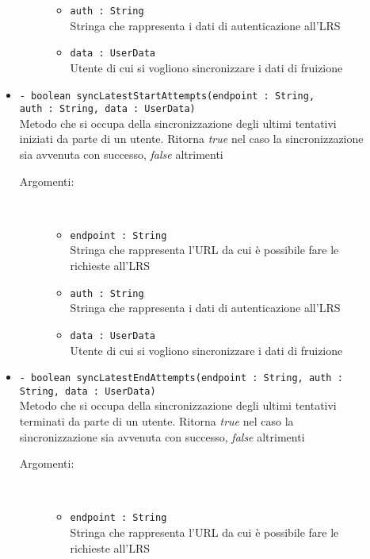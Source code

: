 \documentclass[../Tesi.tex]{subfiles}
\begin{document}
\begin{description}
\begin{itemize}
\begin{description}
\begin{itemize}
						\item \texttt{auth : String}\\
						Stringa che rappresenta i dati di autenticazione all'LRS

						\item \texttt{data : UserData}\\
						Utente di cui si vogliono sincronizzare i dati di fruizione
					\end{itemize}
				\end{description}

				\item \texttt{- boolean syncLatestStartAttempts(endpoint : String, \\auth : String, data : UserData)}\\
				Metodo che si occupa della sincronizzazione degli ultimi tentativi iniziati da parte di un utente. Ritorna \textit{true} nel caso la sincronizzazione sia avvenuta con successo, \textit{false} altrimenti
				\begin{description}
					\item[Argomenti:] \
					\begin{itemize}
						\item \texttt{endpoint : String}\\
						Stringa che rappresenta l'URL da cui è possibile fare le richieste all'LRS

						\item \texttt{auth : String}\\
						Stringa che rappresenta i dati di autenticazione all'LRS

						\item \texttt{data : UserData}\\
						Utente di cui si vogliono sincronizzare i dati di fruizione
					\end{itemize}
				\end{description}

				\item \texttt{- boolean syncLatestEndAttempts(endpoint : String, auth : String, data : UserData)}\\
				Metodo che si occupa della sincronizzazione degli ultimi tentativi terminati da parte di un utente. Ritorna \textit{true} nel caso la sincronizzazione sia avvenuta con successo, \textit{false} altrimenti
				\begin{description}
					\item[Argomenti:] \
					\begin{itemize}
						\item \texttt{endpoint : String}\\
						Stringa che rappresenta l'URL da cui è possibile fare le richieste all'LRS


\end{itemize}
\end{description}
\end{itemize}
\end{description}
\end{document}
